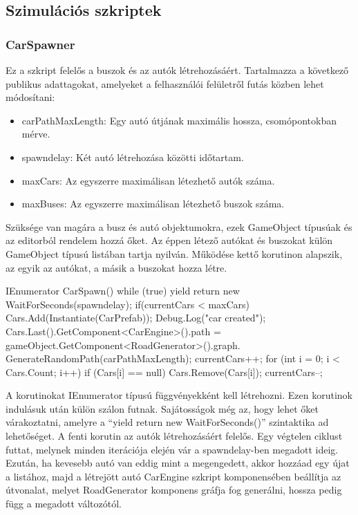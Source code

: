 \subsection{Szimulációs szkriptek}
\subsubsection{CarSpawner}
Ez a szkript felelős a buszok és az autók létrehozásáért. Tartalmazza a következő publikus adattagokat, amelyeket a felhasználói felületről futás közben lehet módosítani:
\begin{itemize}
\item{carPathMaxLength: Egy autó útjának maximális hossza, csomópontokban mérve.}
\item{spawndelay: Két autó létrehozása közötti időtartam.}
\item{maxCars: Az egyszerre maximálisan létezhető autók száma.}
\item{maxBuses: Az egyszerre maximálisan létezhető buszok száma.}
\end{itemize}

Szüksége van magára a busz és autó objektumokra, ezek GameObject típusúak és az editorból rendelem hozzá őket. Az éppen létező autókat és buszokat külön GameObject típusú listában tartja nyilván.
Működése kettő korutinon alapszik, az egyik az autókat, a másik a buszokat hozza létre.
\begin{cpp}
IEnumerator CarSpawn()
{
    while (true)
    {
        yield return new WaitForSeconds(spawndelay);
        if(currentCars < maxCars)
        {
            Cars.Add(Instantiate(CarPrefab));
            Debug.Log("car created");
            Cars.Last().GetComponent<CarEngine>().path = 
            gameObject.GetComponent<RoadGenerator>().graph.
            GenerateRandomPath(carPathMaxLength);
            currentCars++;
        }
        for (int i = 0; i < Cars.Count; i++)
        {
            if (Cars[i] == null)
            {
                Cars.Remove(Cars[i]);
                currentCars--;
            }
        }
     }           
}
\end{cpp}
A korutinokat IEnumerator típusú függvényekként kell létrehozni. Ezen korutinok indulásuk után külön szálon futnak. Sajátosságok még az, hogy lehet őket várakoztatni, amelyre a ``yield return new WaitForSeconds()'' szintaktika ad lehetőséget.
A fenti korutin az autók létrehozásáért felelős. Egy végtelen ciklust futtat, melynek minden iterációja elején vár a spawndelay-ben megadott ideig. Ezután, ha kevesebb autó van eddig mint a megengedett, akkor hozzáad egy újat a listához, majd a létrejött autó CarEngine szkript komponensében beállítja az útvonalat, melyet RoadGenerator komponens gráfja fog generálni, hossza pedig függ a megadott változótól.

